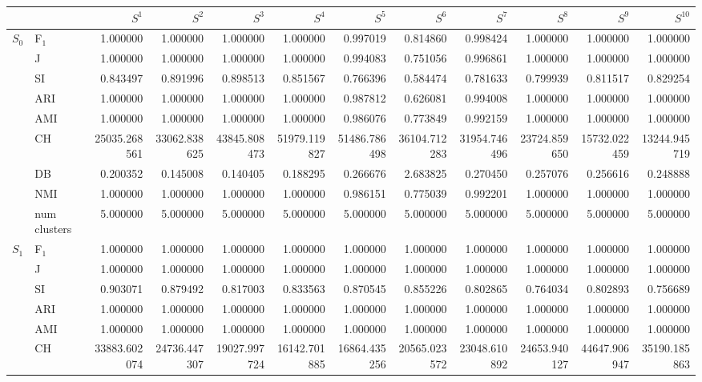 \begin{tabular}{llrrrrrrrrrr}
\toprule
 &  & $S^{1}$ & $S^{2}$ & $S^{3}$ & $S^{4}$ & $S^{5}$ & $S^{6}$ & $S^{7}$ & $S^{8}$ & $S^{9}$ & $S^{10}$ \\
\midrule
\multirow[c]{9}{*}{$S_{0}$} & F$_1$ & 1.000000 & 1.000000 & 1.000000 & 1.000000 & 0.997019 & 0.814860 & 0.998424 & 1.000000 & 1.000000 & 1.000000 \\
 & J & 1.000000 & 1.000000 & 1.000000 & 1.000000 & 0.994083 & 0.751056 & 0.996861 & 1.000000 & 1.000000 & 1.000000 \\
 & SI & 0.843497 & 0.891996 & 0.898513 & 0.851567 & 0.766396 & 0.584474 & 0.781633 & 0.799939 & 0.811517 & 0.829254 \\
 & ARI & 1.000000 & 1.000000 & 1.000000 & 1.000000 & 0.987812 & 0.626081 & 0.994008 & 1.000000 & 1.000000 & 1.000000 \\
 & AMI & 1.000000 & 1.000000 & 1.000000 & 1.000000 & 0.986076 & 0.773849 & 0.992159 & 1.000000 & 1.000000 & 1.000000 \\
 & CH & 25035.268561 & 33062.838625 & 43845.808473 & 51979.119827 & 51486.786498 & 36104.712283 & 31954.746496 & 23724.859650 & 15732.022459 & 13244.945719 \\
 & DB & 0.200352 & 0.145008 & 0.140405 & 0.188295 & 0.266676 & 2.683825 & 0.270450 & 0.257076 & 0.256616 & 0.248888 \\
 & NMI & 1.000000 & 1.000000 & 1.000000 & 1.000000 & 0.986151 & 0.775039 & 0.992201 & 1.000000 & 1.000000 & 1.000000 \\
 & num clusters & 5.000000 & 5.000000 & 5.000000 & 5.000000 & 5.000000 & 5.000000 & 5.000000 & 5.000000 & 5.000000 & 5.000000 \\
\multirow[c]{9}{*}{$S_{1}$} & F$_1$ & 1.000000 & 1.000000 & 1.000000 & 1.000000 & 1.000000 & 1.000000 & 1.000000 & 1.000000 & 1.000000 & 1.000000 \\
 & J & 1.000000 & 1.000000 & 1.000000 & 1.000000 & 1.000000 & 1.000000 & 1.000000 & 1.000000 & 1.000000 & 1.000000 \\
 & SI & 0.903071 & 0.879492 & 0.817003 & 0.833563 & 0.870545 & 0.855226 & 0.802865 & 0.764034 & 0.802893 & 0.756689 \\
 & ARI & 1.000000 & 1.000000 & 1.000000 & 1.000000 & 1.000000 & 1.000000 & 1.000000 & 1.000000 & 1.000000 & 1.000000 \\
 & AMI & 1.000000 & 1.000000 & 1.000000 & 1.000000 & 1.000000 & 1.000000 & 1.000000 & 1.000000 & 1.000000 & 1.000000 \\
 & CH & 33883.602074 & 24736.447307 & 19027.997724 & 16142.701885 & 16864.435256 & 20565.023572 & 23048.610892 & 24653.940127 & 44647.906947 & 35190.185863 \\

\end{tabular}
